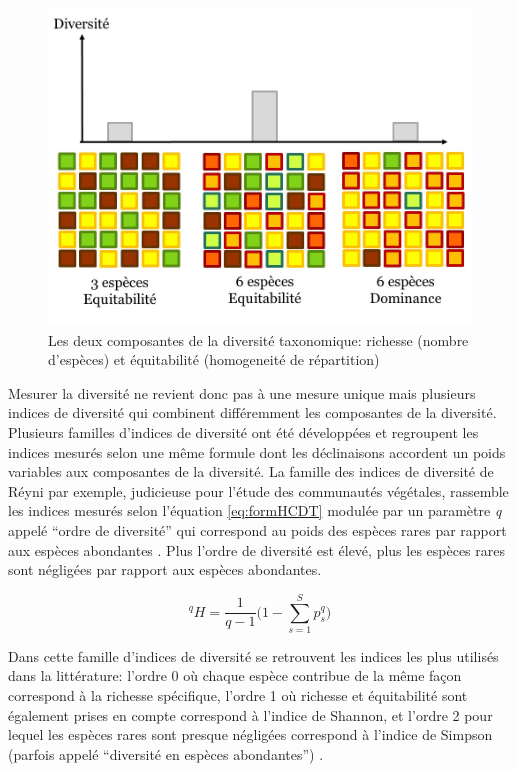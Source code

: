 \documentclass[
  11pt,
  french,
  A4paper,
  extrafontsizes,onecolumn,openright
  ]{memoir}
\begin{document}
\begin{figure}

{\centering \includegraphics[width=0.6\linewidth]{ExternalFig/Fig_RichnessEquitability} 

}

\caption{Les deux composantes de la diversité taxonomique: richesse (nombre d'espèces) et équitabilité (homogeneité de répartition)}\label{fig:RichEqu}
\end{figure}

Mesurer la diversité ne revient donc pas à une mesure unique mais
plusieurs indices de diversité qui combinent différemment les
composantes de la diversité. Plusieurs familles d'indices de diversité
ont été développées et regroupent les indices mesurés selon une même
formule dont les déclinaisons accordent un poids variables aux
composantes de la diversité. La famille des indices de diversité de
Réyni par exemple, judicieuse pour l'étude des communautés végétales,
rassemble les indices mesurés selon l'équation \eqref{eq:formHCDT} modulée
par un paramètre \emph{q} appelé ``ordre de diversité'' qui correspond
au poids des espèces rares par rapport aux espèces abondantes
\autocite{Mendes2008}. Plus l'ordre de diversité est élevé, plus les
espèces rares sont négligées par rapport aux espèces abondantes.

\begin{equation}
{^{q}H=\frac{1}{q-1}\Bigg(1-\displaystyle\sum_{s=1}^{S}p^q_s\Bigg) }
\label{eq:formHCDT}
\end{equation}

Dans cette famille d'indices de diversité se retrouvent les indices les
plus utilisés dans la littérature: l'ordre 0 où chaque espèce contribue
de la même façon correspond à la richesse spécifique, l'ordre 1 où
richesse et équitabilité sont également prises en compte correspond à
l'indice de Shannon, et l'ordre 2 pour lequel les espèces rares sont
presque négligées correspond à l'indice de Simpson (parfois appelé
``diversité en espèces abondantes'')
\autocites{Shannon1948}{Simpson1949}{Patil1982}{Tothmeresz1995}.
\end{document}
